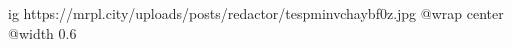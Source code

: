  
 
 
 
 

\ifcmt
  ig https://mrpl.city/uploads/posts/redactor/tespminvchaybf0z.jpg
  @wrap center
  @width 0.6
\fi
